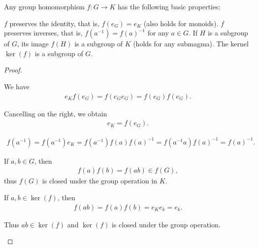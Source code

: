 \begin{proposition}\label{thm:group_homomorphism_properties}
  Any group homomorphism \( f: G \to K \) has the following basic properties:
  \begin{defenum}
     \( f \) preserves the identity, that is, \( f(e_G) = e_K \) (also holds for monoids).
     \( f \) preserves inverses, that is, \( f(a^{-1}) = f(a)^{-1} \) for any \( a \in G \).
     If \( H \) is a subgroup of \( G \), its image \( f(H) \) is a subgroup of \( K \) (holds for any submagma).
     The kernel \( \ker(f) \) is a subgroup of \( G \).
  \end{defenum}
\end{proposition}
\begin{proof}\mbox{}
  \begin{itemize}
     We have
    \begin{align*}
      e_K f(e_G) = f(e_G e_G) = f(e_G) f(e_G).
    \end{align*}

    Cancelling on the right, we obtain
    \begin{align*}
      e_K = f(e_G).
    \end{align*}

    \begin{align*}
      f(a^{-1})
      =
      f(a^{-1}) e_K
      =
      f(a^{-1}) f(a) f(a)^{-1}
      =
      f(a^{-1} a) f(a)^{-1}
      =
      f(a)^{-1}.
    \end{align*}

     If \( a, b \in G \), then
    \begin{align*}
      f(a) f(b) = f(ab) \in f(G),
    \end{align*}
    thus \( f(G) \) is closed under the group operation in \( K \).

     If \( a, b \in \ker(f) \), then
    \begin{align*}
      f(ab) = f(a) f(b) = e_K e_k = e_k.
    \end{align*}

    Thus \( ab \in \ker(f) \) and \( \ker(f) \) is closed under the group operation.
  \end{itemize}
\end{proof}

